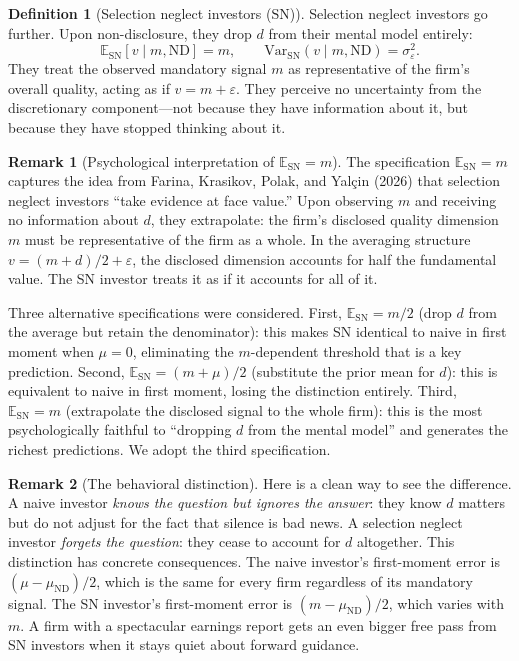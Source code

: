 \documentclass[12pt]{article}
\theoremstyle{plain}
\theoremstyle{definition}
\newtheorem{definition}{Definition}
\newtheorem{remark}{Remark}
\newcommand{\E}{\mathbb{E}}
\newcommand{\Var}{\mathrm{Var}}
\newcommand{\ND}{\mathrm{ND}}
\newcommand{\SN}{\mathrm{SN}}
\begin{document}
\begin{definition}[Selection neglect investors ($\SN$)]
\label{def:sn}
Selection neglect investors go further. Upon non-disclosure, they drop $d$ from their mental model entirely:
\[
\E_\SN[v \mid m, \ND] = m, \qquad \Var_\SN(v \mid m, \ND) = \sigma_\varepsilon^2.
\]
They treat the observed mandatory signal $m$ as representative of the firm's overall quality, acting as if $v = m + \varepsilon$. They perceive no uncertainty from the discretionary component---not because they have information about it, but because they have stopped thinking about it.
\end{definition}

\begin{remark}[Psychological interpretation of $\E_\SN = m$]
\label{rmk:sn_interp}
The specification $\E_\SN = m$ captures the idea from Farina, Krasikov, Polak, and Yal\c{c}in (2026) that selection neglect investors ``take evidence at face value.'' Upon observing $m$ and receiving no information about $d$, they extrapolate: the firm's disclosed quality dimension $m$ must be representative of the firm as a whole. In the averaging structure $v = (m+d)/2 + \varepsilon$, the disclosed dimension accounts for half the fundamental value. The SN investor treats it as if it accounts for all of it.

Three alternative specifications were considered. First, $\E_\SN = m/2$ (drop $d$ from the average but retain the denominator): this makes SN identical to naive in first moment when $\mu = 0$, eliminating the $m$-dependent threshold that is a key prediction. Second, $\E_\SN = (m + \mu)/2$ (substitute the prior mean for $d$): this is equivalent to naive in first moment, losing the distinction entirely. Third, $\E_\SN = m$ (extrapolate the disclosed signal to the whole firm): this is the most psychologically faithful to ``dropping $d$ from the mental model'' and generates the richest predictions. We adopt the third specification.
\end{remark}

\begin{remark}[The behavioral distinction]
Here is a clean way to see the difference. A naive investor \emph{knows the question but ignores the answer}: they know $d$ matters but do not adjust for the fact that silence is bad news. A selection neglect investor \emph{forgets the question}: they cease to account for $d$ altogether. This distinction has concrete consequences. The naive investor's first-moment error is $(\mu - \mu_{\ND})/2$, which is the same for every firm regardless of its mandatory signal. The SN investor's first-moment error is $(m - \mu_{\ND})/2$, which varies with $m$. A firm with a spectacular earnings report gets an even bigger free pass from SN investors when it stays quiet about forward guidance.
\end{remark}
\end{document}
